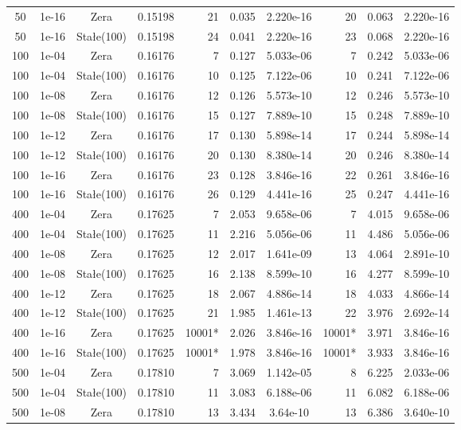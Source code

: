 \documentclass[twoside]{article}
\begin{document}
\begin{table}[H]
\begin{tabular}{c c c c r c c r c c}
50 & 1e-16 & Zera & 0.15198 & 21 & 0.035 & 2.220e-16 & 20 & 0.063 & 2.220e-16 \\
50 & 1e-16 & Stałe(100) & 0.15198 & 24 & 0.041 & 2.220e-16 & 23 & 0.068 & 2.220e-16 \\
\midrule
100 & 1e-04 & Zera & 0.16176 & 7 & 0.127 & 5.033e-06 & 7 & 0.242 & 5.033e-06 \\
100 & 1e-04 & Stałe(100) & 0.16176 & 10 & 0.125 & 7.122e-06 & 10 & 0.241 & 7.122e-06 \\
100 & 1e-08 & Zera & 0.16176 & 12 & 0.126 & 5.573e-10 & 12 & 0.246 & 5.573e-10 \\
100 & 1e-08 & Stałe(100) & 0.16176 & 15 & 0.127 & 7.889e-10 & 15 & 0.248 & 7.889e-10 \\
100 & 1e-12 & Zera & 0.16176 & 17 & 0.130 & 5.898e-14 & 17 & 0.244 & 5.898e-14 \\
100 & 1e-12 & Stałe(100) & 0.16176 & 20 & 0.130 & 8.380e-14 & 20 & 0.246 & 8.380e-14 \\
100 & 1e-16 & Zera & 0.16176 & 23 & 0.128 & 3.846e-16 & 22 & 0.261 & 3.846e-16 \\
100 & 1e-16 & Stałe(100) & 0.16176 & 26 & 0.129 & 4.441e-16 & 25 & 0.247 & 4.441e-16 \\
\midrule
400 & 1e-04 & Zera & 0.17625 & 7 & 2.053 & 9.658e-06 & 7 & 4.015 & 9.658e-06 \\
400 & 1e-04 & Stałe(100) & 0.17625 & 11 & 2.216 & 5.056e-06 & 11 & 4.486 & 5.056e-06 \\
400 & 1e-08 & Zera & 0.17625 & 12 & 2.017 & 1.641e-09 & 13 & 4.064 & 2.891e-10 \\
400 & 1e-08 & Stałe(100) & 0.17625 & 16 & 2.138 & 8.599e-10 & 16 & 4.277 & 8.599e-10 \\
400 & 1e-12 & Zera & 0.17625 & 18 & 2.067 & 4.886e-14 & 18 & 4.033 & 4.866e-14 \\
400 & 1e-12 & Stałe(100) & 0.17625 & 21 & 1.985 & 1.461e-13 & 22 & 3.976 & 2.692e-14 \\
400 & 1e-16 & Zera & 0.17625 & 10001* & 2.026 & 3.846e-16 & 10001* & 3.971 & 3.846e-16 \\
400 & 1e-16 & Stałe(100) & 0.17625 & 10001* & 1.978 & 3.846e-16 & 10001* & 3.933 & 3.846e-16 \\
\midrule
500 & 1e-04 & Zera & 0.17810 & 7 & 3.069 & 1.142e-05 & 8 & 6.225 & 2.033e-06 \\
500 & 1e-04 & Stałe(100) & 0.17810 & 11 & 3.083 & 6.188e-06 & 11 & 6.082 & 6.188e-06 \\
500 & 1e-08 & Zera & 0.17810 & 13 & 3.434 & 3.64e-10 & 13 & 6.386 & 3.640e-10 \\

\end{tabular}
\end{table}
\end{document}

